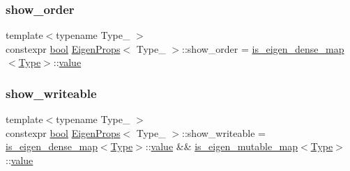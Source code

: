 \subsubsection{\texorpdfstring{show\_order}{show\_order}}
{\footnotesize\ttfamily template$<$typename Type\+\_\+ $>$ \\
constexpr \mbox{\hyperlink{asdl_8h_af6a258d8f3ee5206d682d799316314b1}{bool}} \mbox{\hyperlink{struct_eigen_props}{Eigen\+Props}}$<$ Type\+\_\+ $>$\+::show\+\_\+order = \mbox{\hyperlink{eigen_8h_a403c575c8e7ae68daa89a11a4b683038}{is\+\_\+eigen\+\_\+dense\+\_\+map}}$<$\mbox{\hyperlink{struct_eigen_props_ababed0b6298eeb5f4ded06da92c96cd7}{Type}}$>$\+::\mbox{\hyperlink{_s_d_l__opengl__glext_8h_a8ad81492d410ff2ac11f754f4042150f}{value}}\hspace{0.3cm}{\ttfamily [static]}}

\mbox{\label{struct_eigen_props_a028698ea3f672d4a0e95922dc6553f23}} 
\subsubsection{\texorpdfstring{show\_writeable}{show\_writeable}}
{\footnotesize\ttfamily template$<$typename Type\+\_\+ $>$ \\
constexpr \mbox{\hyperlink{asdl_8h_af6a258d8f3ee5206d682d799316314b1}{bool}} \mbox{\hyperlink{struct_eigen_props}{Eigen\+Props}}$<$ Type\+\_\+ $>$\+::show\+\_\+writeable = \mbox{\hyperlink{eigen_8h_a403c575c8e7ae68daa89a11a4b683038}{is\+\_\+eigen\+\_\+dense\+\_\+map}}$<$\mbox{\hyperlink{struct_eigen_props_ababed0b6298eeb5f4ded06da92c96cd7}{Type}}$>$\+::\mbox{\hyperlink{_s_d_l__opengl__glext_8h_a8ad81492d410ff2ac11f754f4042150f}{value}} \&\& \mbox{\hyperlink{eigen_8h_aabbcc3f1a17addf39e1577576553acf5}{is\+\_\+eigen\+\_\+mutable\+\_\+map}}$<$\mbox{\hyperlink{struct_eigen_props_ababed0b6298eeb5f4ded06da92c96cd7}{Type}}$>$\+::\mbox{\hyperlink{_s_d_l__opengl__glext_8h_a8ad81492d410ff2ac11f754f4042150f}{value}}\hspace{0.3cm}{\ttfamily [static]}}

\mbox{\label{struct_eigen_props_a9765247d03fa7156e28b73409689df17}} 
